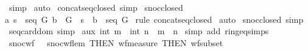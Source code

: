 \begin{isabellebody}
\isamarkupfalse%
\ simp\isanewline
{}\isamarkupfalse%
\ auto\isanewline
{}\isamarkupfalse%
%
\endisatagproof
{\isafoldproof}%
%
\isadelimproof
\isanewline
%
\endisadelimproof
{}\isamarkupfalse%
\ concatseq{\isacharunderscore}closed\ {\isacharbrackleft}simp{\isacharbrackright}\isanewline
\isanewline
{}\isamarkupfalse%
\ snoc{\isacharunderscore}closed{\isacharcolon}\ \isanewline
{\isachardoublequoteopen}{\isacharbang}{\isacharbang}a{\isachardot}\ {\isacharbrackleft}{\isacharbar}s\ {\isacharcolon}\ seq\ G{\isacharsemicolon}\ b\ {\isacharcolon}\ G{\isacharbar}{\isacharbrackright}\ {\isacharequal}{\isacharequal}{\isachargreater}\ {\isacharparenleft}s\ {\isacharpercent}{\isacharampersand}{\isacharcircum}\ {\isacharpercent}{\isacharless}b{\isacharpercent}{\isachargreater}{\isacharparenright}\ {\isacharcolon}\ seq\ G{\isachardoublequoteclose}\isanewline
%
\isadelimproof
%
\endisadelimproof
%
\isatagproof
{}\isamarkupfalse%
\ {\isacharparenleft}rule\ concatseq{\isacharunderscore}closed{\isacharparenright}\isanewline
{}\isamarkupfalse%
\ auto\isanewline
{}\isamarkupfalse%
%
\endisatagproof
{\isafoldproof}%
%
\isadelimproof
\isanewline
%
\endisadelimproof
{}\isamarkupfalse%
\ snoc{\isacharunderscore}closed\ {\isacharbrackleft}simp{\isacharbrackright}\isanewline
\isanewline
\isanewline
\isanewline
\isanewline
\isanewline
{}\isamarkupfalse%
\ seq{\isacharunderscore}card{\isacharunderscore}dom\ {\isacharbrackleft}simp{\isacharbrackright}\isanewline
\isanewline
{}\isamarkupfalse%
\ aux{\isacharcolon}\ {\isachardoublequoteopen}{\isacharparenleft}int\ m\ {\isacharless}\ int\ n{\isacharparenright}\ {\isacharequal}\ {\isacharparenleft}m\ {\isacharless}\ n{\isacharparenright}{\isachardoublequoteclose}\isanewline
%
\isadelimproof
%
\endisadelimproof
%
\isatagproof
{}\isamarkupfalse%
\ {\isacharparenleft}simp\ add{\isacharcolon}\ ring{\isacharunderscore}eq{\isacharunderscore}simps{\isacharparenright}\isanewline
{}\isamarkupfalse%
%
\endisatagproof
{\isafoldproof}%
%
\isadelimproof
\isanewline
%
\endisadelimproof
\isanewline
\isanewline
\isanewline
\isanewline
\isanewline
{}\isamarkupfalse%
\ snoc{\isacharunderscore}wf\ {\isacharequal}\ \ snoc{\isacharunderscore}wf{\isacharunderscore}lem\ {\isacharbrackleft}THEN\ wf{\isacharunderscore}measure\ {\isacharbrackleft}THEN\ wf{\isacharunderscore}subset{\isacharbrackright}{\isacharbrackright}\ \isanewline
\isanewline

\end{isabellebody}

